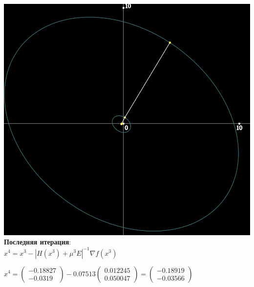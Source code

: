 \includegraphics[width=\linewidth]{images/5_graf}\\

\textbf{Последняя итерация}:\\

$x^{4} = x^{3} - |H(x^{3}) + \mu^{3}E|^{-1} \nabla f(x^{3})$

$
x^{4} = 
\begin{pmatrix}
  -0.18827\\
  -0.0319
\end{pmatrix}
- 0.07513
\begin{pmatrix}
  0.012245\\
  0.050047
\end{pmatrix}
=
\begin{pmatrix}
  -0.18919\\
  -0.03566
\end{pmatrix}
$

\pagebreak

